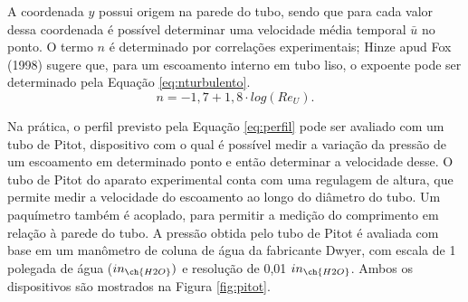 \noindent A coordenada $y$ possui origem na parede do tubo, sendo que para cada valor dessa coordenada é possível determinar uma velocidade média temporal $\bar{u}$ no ponto. O termo $n$ é determinado por correlações experimentais; Hinze apud Fox (1998) sugere que, para um escoamento interno em tubo liso, o expoente pode ser determinado pela Equação \eqref{eq:nturbulento}. 
\begin{equation} \label{eq:nturbulento}
n = -1,7 + 1,8\cdot log(Re_U).
\end{equation}

Na prática, o perfil previsto pela Equação \eqref{eq:perfil} pode ser avaliado com um tubo de Pitot, dispositivo com o qual é possível medir a variação da pressão de um escoamento em determinado ponto e então determinar a velocidade desse. O tubo de Pitot do aparato experimental conta com uma regulagem de altura, que permite medir a velocidade do escoamento ao longo do diâmetro do tubo. Um paquímetro também é acoplado, para permitir a medição do comprimento em relação à parede do tubo. A pressão obtida pelo tubo de Pitot é avaliada com base em um manômetro de coluna de água da fabricante Dwyer, com escala de 1 polegada de água ($in_{\ch{H2O}})$ e resolução de 0,01 $in_{\ch{H2O}}$. Ambos os dispositivos são mostrados na Figura \ref{fig:pitot}.

